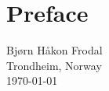 \chapter*{Preface}



\vspace{\fill}
\begin{flushright}
Bjørn Håkon Frodal \\
Trondheim, Norway \\
\today
\end{flushright}